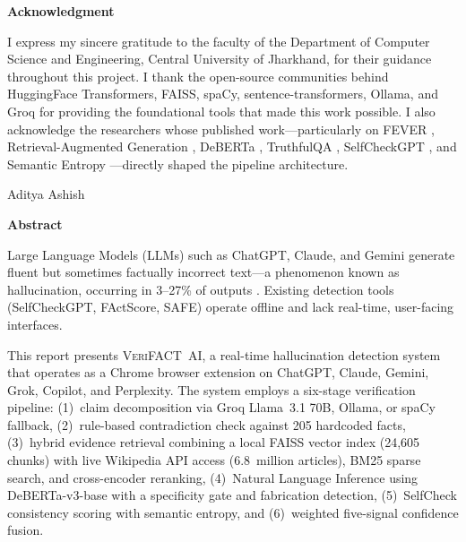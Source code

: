 \documentclass[12pt, a4paper, oneside]{report}
\newcommand{\verifact}{\textsc{VeriFACT~AI}}
\newcommand{\deberta}{DeBERTa-v3}
\begin{document}
\newpage
\thispagestyle{empty}
\begin{center}
{\Large\bfseries Acknowledgment}\\[1cm]
\end{center}

I express my sincere gratitude to the faculty of the Department of Computer Science and Engineering, Central University of Jharkhand, for their guidance throughout this project. I thank the open-source communities behind HuggingFace Transformers, FAISS, spaCy, sentence-transformers, Ollama, and Groq for providing the foundational tools that made this work possible. I also acknowledge the researchers whose published work---particularly on FEVER \cite{thorne2018fever}, Retrieval-Augmented Generation \cite{lewis2020rag}, DeBERTa \cite{he2021deberta}, TruthfulQA \cite{lin2022truthfulqa}, SelfCheckGPT \cite{manakul2023selfcheck}, and Semantic Entropy \cite{kuhn2024entropy}---directly shaped the pipeline architecture.

\vspace{1cm}
\begin{flushright}
Aditya Ashish
\end{flushright}

\newpage
\thispagestyle{empty}
\begin{center}
{\Large\bfseries Abstract}\\[1cm]
\end{center}

Large Language Models (LLMs) such as ChatGPT, Claude, and Gemini generate fluent but sometimes factually incorrect text---a phenomenon known as hallucination, occurring in 3--27\% of outputs \cite{lin2022truthfulqa}. Existing detection tools (SelfCheckGPT, FActScore, SAFE) operate offline and lack real-time, user-facing interfaces.

This report presents \verifact{}, a real-time hallucination detection system that operates as a Chrome browser extension on ChatGPT, Claude, Gemini, Grok, Copilot, and Perplexity. The system employs a six-stage verification pipeline: (1)~claim decomposition via Groq Llama~3.1 70B, Ollama, or spaCy fallback, (2)~rule-based contradiction check against 205 hardcoded facts, (3)~hybrid evidence retrieval combining a local FAISS vector index (24{,}605 chunks) with live Wikipedia API access (6.8~million articles), BM25 sparse search, and cross-encoder reranking, (4)~Natural Language Inference using \deberta{}-base with a specificity gate and fabrication detection, (5)~SelfCheck consistency scoring with semantic entropy, and (6)~weighted five-signal confidence fusion.
\end{document}
